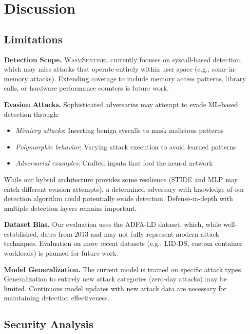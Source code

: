 
\section{Discussion}
\label{sec:discussion}

\subsection{Limitations}

\textbf{Detection Scope.}
\textsc{WasmSentinel} currently focuses on syscall-based detection, which may miss attacks that operate entirely within user space (e.g., some in-memory attacks).
Extending coverage to include memory access patterns, library calls, or hardware performance counters is future work.

\textbf{Evasion Attacks.}
Sophisticated adversaries may attempt to evade ML-based detection through:
\begin{itemize}
    \item \textit{Mimicry attacks}: Inserting benign syscalls to mask malicious patterns
    \item \textit{Polymorphic behavior}: Varying attack execution to avoid learned patterns
    \item \textit{Adversarial examples}: Crafted inputs that fool the neural network
\end{itemize}

While our hybrid architecture provides some resilience (STIDE and MLP may catch different evasion attempts), a determined adversary with knowledge of our detection algorithm could potentially evade detection.
Defense-in-depth with multiple detection layers remains important.

\textbf{Dataset Bias.}
Our evaluation uses the ADFA-LD dataset, which, while well-established, dates from 2013 and may not fully represent modern attack techniques.
Evaluation on more recent datasets (e.g., LID-DS, custom container workloads) is planned for future work.

\textbf{Model Generalization.}
The current model is trained on specific attack types.
Generalization to entirely new attack categories (zero-day attacks) may be limited.
Continuous model updates with new attack data are necessary for maintaining detection effectiveness.

\subsection{Security Analysis}

